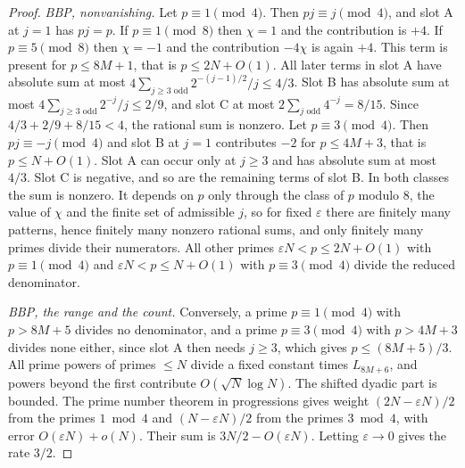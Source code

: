 \documentclass[11pt]{article}
\begin{document}
\begin{proof}
\emph{BBP, nonvanishing.} Let $p\equiv1\pmod4$. Then $pj\equiv j\pmod 4$, and slot A at $j=1$ has $pj=p$. If $p\equiv1\pmod8$ then $\chi=1$ and the contribution is $+4$. If $p\equiv5\pmod8$ then $\chi=-1$ and the contribution $-4\chi$ is again $+4$. This term is present for $p\le8M+1$, that is $p\le2N+O(1)$. All later terms in slot A have absolute sum at most $4\sum_{j\ge3\text{ odd}}2^{-(j-1)/2}/j\le4/3$. Slot B has absolute sum at most $4\sum_{j\ge3\text{ odd}}2^{-j}/j\le2/9$, and slot C at most $2\sum_{j\text{ odd}}4^{-j}=8/15$. Since $4/3+2/9+8/15<4$, the rational sum is nonzero. Let $p\equiv3\pmod4$. Then $pj\equiv-j\pmod4$ and slot B at $j=1$ contributes $-2$ for $p\le4M+3$, that is $p\le N+O(1)$. Slot A can occur only at $j\ge3$ and has absolute sum at most $4/3$. Slot C is negative, and so are the remaining terms of slot B. In both classes the sum is nonzero. It depends on $p$ only through the class of $p$ modulo $8$, the value of $\chi$ and the finite set of admissible $j$, so for fixed $\varepsilon$ there are finitely many patterns, hence finitely many nonzero rational sums, and only finitely many primes divide their numerators. All other primes $\varepsilon N<p\le2N+O(1)$ with $p\equiv1\pmod4$ and $\varepsilon N<p\le N+O(1)$ with $p\equiv3\pmod4$ divide the reduced denominator.

\emph{BBP, the range and the count.} Conversely, a prime $p\equiv1\pmod4$ with $p>8M+5$ divides no denominator, and a prime $p\equiv3\pmod4$ with $p>4M+3$ divides none either, since slot A then needs $j\ge3$, which gives $p\le(8M+5)/3$. All prime powers of primes $\le N$ divide a fixed constant times $L_{8M+6}$, and powers beyond the first contribute $O(\sqrt N\log N)$. The shifted dyadic part is bounded. The prime number theorem in progressions \cite[\S19, p.~219, modulus $4$]{hadamard} gives weight $(2N-\varepsilon N)/2$ from the primes $1\bmod 4$ and $(N-\varepsilon N)/2$ from the primes $3\bmod 4$, with error $O(\varepsilon N)+o(N)$. Their sum is $3N/2-O(\varepsilon N)$. Letting $\varepsilon\to0$ gives the rate $3/2$.


\end{proof}
\end{document}
